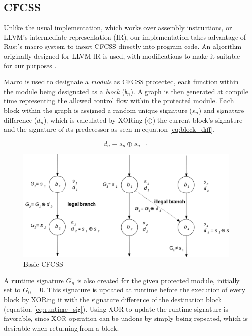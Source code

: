 \subsection{CFCSS}

Unlike the usual implementation, which works over assembly instructions, or LLVM's intermediate representation (IR), our implementation takes advantage of Rust's macro system to insert CFCSS directly into program code. An algorithm originally designed for LLVM IR is used, with modifications to make it suitable for our purposes \cite{coast:cfcss}.

Macro is used to designate a \textit{module} as CFCSS protected, each function within the module being designated as a \textit{block} ({$b_n$}). A graph is then generated at compile time representing the allowed control flow within the protected module. Each block within the graph is assigned a random unique signature ({$s_n$}) and signature difference ({$d_n$}), which is calculated by XORing ({$\oplus$}) the current block's signature and the signature of its predecessor as seen in equation \ref{eq:block_diff}.

\begin{equation}
d_n = s_n \oplus s_{n-1}
\label{eq:block_diff}
\end{equation}

\begin{figure}[!h]
    \centering
    \includegraphics[width=1.0\textwidth]{diagrams/cfcss/basic.png}
    \caption{Basic CFCSS \cite{coast:cfcss}}
\end{figure}

A runtime signature {$G_n$} is also created for the given protected module, initially set to {$G_0 = 0$}. This signature is updated at runtime before the execution of every block by XORing it with the signature difference of the destination block (equation \ref{eq:runtime_sig}). Using XOR to update the runtime signature is favorable, since XOR operation can be undone by simply being repeated, which is desirable when returning from a block.

